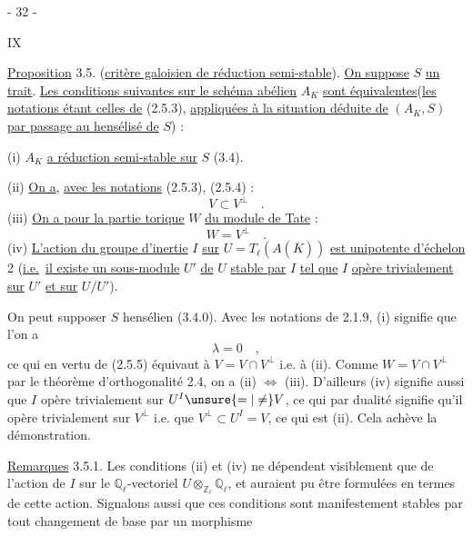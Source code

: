 \begin{center}- 32 -\end{center}\hfill IX

\uline{Proposition} 3.5. (\uline{critère galoisien de réduction semi-stable}). \uline{On suppose} $S$ \uline{un trait}. \uline{Les conditions suivantes sur le schéma abélien} $A_K$ \uline{sont équivalentes}\quad (\uline{les notations étant celles de} (2.5.3), \uline{appliquées à la situation déduite de} $(A_K,S)$ \uline{par passage au hensélisé de} $S$) :

(i) $A_K$ \uline{a réduction semi-stable sur} $S$ (3.4).

(ii) \uline{On a}, \uline{avec les notations} (2.5.3), (2.5.4) :
\[
V\subset V^\perp\quad.
\]
(iii) \uline{On a pour la partie torique} $W$ \uline{du module de Tate} :
\[
W=V^\perp\quad.
\]
(iv) \uline{L'action du groupe d'inertie} $I$ \uline{sur} $U=T_\ell(A(\overline K))$ \uline{est unipotente d'échelon} 2 (\uline{i.e.}\ \uline{il existe un sous-module} $U'$ \uline{de} $U$ \uline{stable par} $I$ \uline{tel que} $I$ \uline{opère trivialement sur} $U'$ \uline{et sur} $U/U'$).

On peut supposer $S$ hensélien (3.4.0). Avec les notations de 2.1.9, (i) signifie que l'on a
\[
\lambda=0\quad,
\]
ce qui en vertu de (2.5.5) équivaut à $V=V\cap V^\perp$ i.e. à (ii). Comme $W=V\cap V^\perp$ par le théorème d'orthogonalité 2.4, on a (ii) $\Longleftrightarrow$ (iii). D'ailleurs (iv) signifie aussi que $I$ opère trivialement sur $U^I\unsure{=|\ne}V$, ce qui par dualité signifie qu'il opère trivialement sur $V^\perp$ i.e. que $V^\perp\subset U^I=V$, ce qui est (ii). Cela achève la démonstration.

\uline{Remarques} 3.5.1. Les conditions (ii) et (iv) ne dépendent visiblement que de l'action de $I$ sur le $\mathbb Q_\ell$-vectoriel $U\otimes_{\mathbb Z_\ell}\mathbb Q_\ell$, et auraient pu être formulées en termes de cette action. Signalons aussi que ces conditions sont manifestement stables par tout changement de base par un morphisme

